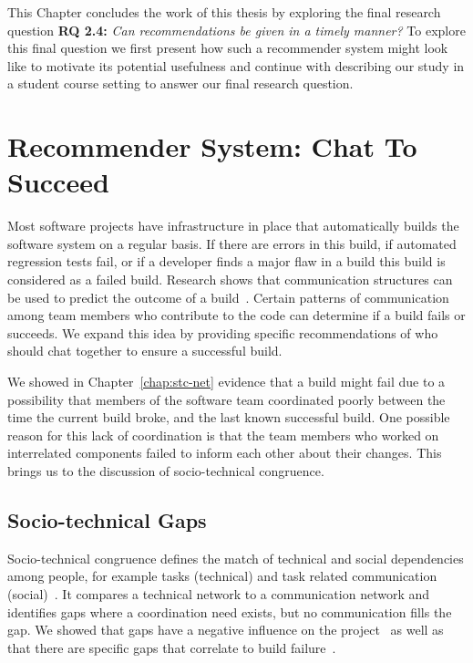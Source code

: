 \label{chap:actionable}
This Chapter concludes the work of this thesis by exploring the final research question \textbf{RQ 2.4:} \emph{Can recommendations be given in a timely manner?}
To explore this final question we first present how such a recommender system might look like to motivate its potential usefulness and continue with describing our study in a student course setting to answer our final research question.

\section{Recommender System: Chat To Succeed}
\label{chap:making:sec:cts}
Most software projects have infrastructure in place that automatically builds the software system on a regular basis. 
If there are errors in this build, if automated regression tests fail, or if a developer finds a major flaw in a build this build is considered as a failed build.  
Research shows that communication structures can be used to predict the outcome of a build~\cite{wolf:icse:2009}.  
Certain patterns of communication among team members who contribute to the code can determine if a build fails or succeeds. 
We expand this idea by providing specific recommendations of who should chat together to ensure a successful build.

We showed in Chapter~\ref{chap:stc-net} evidence that a build might fail due to a possibility that members of the software team coordinated poorly between the time the current build broke, and the last known successful build. 
One possible reason for this lack of coordination is that the team members who worked on interrelated components failed to inform each other about their changes. 
This brings us to the discussion of socio-technical congruence.

\subsection{Socio-technical Gaps}
Socio-technical congruence defines the match of technical and social dependencies among people, for example tasks (technical) and task related communication (social)~\cite{cataldo:cscw:2006}. 
It compares a technical network to a communication network and identifies gaps where a coordination need exists, but no communication fills the gap. 
We showed that gaps have a negative influence on the project~\cite{} as well as that there are specific gaps that correlate to build failure~\cite{}. 

